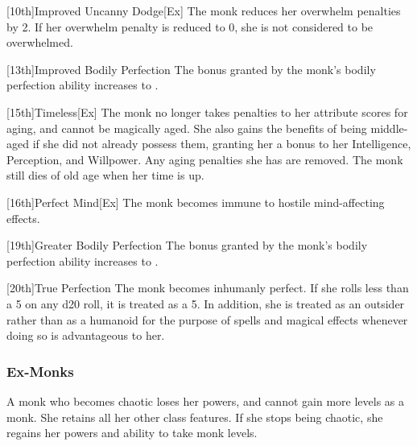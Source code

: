 [10th]{Improved Uncanny Dodge}[Ex]
 The monk reduces her overwhelm penalties by 2.
If her overwhelm penalty is reduced to 0, she is not considered to be overwhelmed.

[13th]{Improved Bodily Perfection}
The bonus granted by the monk's bodily perfection ability increases to .

[15th]{Timeless}[Ex]
The monk no longer takes penalties to her attribute scores for aging, and cannot be magically aged.
She also gains the benefits of being middle-aged if she did not already possess them, granting her a  bonus to her Intelligence, Perception, and Willpower.
Any aging penalties she has are removed.
The monk still dies of old age when her time is up.

[16th]{Perfect Mind}[Ex]
The monk becomes immune to hostile mind-affecting effects.

[19th]{Greater Bodily Perfection}
The bonus granted by the monk's bodily perfection ability increases to .

[20th]{True Perfection}
The monk becomes inhumanly perfect.
If she rolls less than a 5 on any d20 roll, it is treated as a 5.
In addition, she is treated as an outsider rather than as a humanoid for the purpose of spells and magical effects whenever doing so is advantageous to her.

\subsubsection{Ex-Monks}
A monk who becomes chaotic loses her \ki powers, and cannot gain more levels as a monk.
She retains all her other class features.
If she stops being chaotic, she regains her \ki powers and ability to take monk levels.

